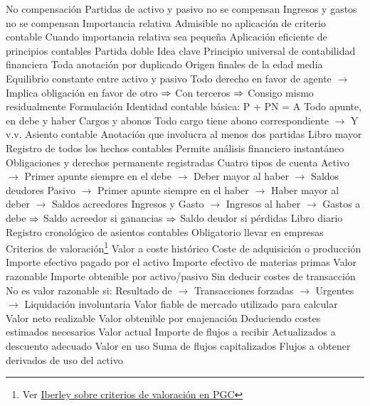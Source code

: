 \documentclass{nuevotema}
\begin{document}
\begin{esquemal}
			\3 No compensación
				\4 Partidas de activo y pasivo no se compensan
				\4 Ingresos y gastos no se compensan
			\3 Importancia relativa
				\4 Admisible no aplicación de criterio contable
				\4[] Cuando importancia relativa sea pequeña
				\4 Aplicación eficiente de principios contables
		\2 Partida doble
			\3 Idea clave
				\4 Principio universal de contabilidad financiera
				\4 Toda anotación por duplicado
				\4 Origen finales de la edad media
				\4 Equilibrio constante entre activo y pasivo
				\4[] Todo derecho en favor de agente
				\4[] $\to$ Implica obligación en favor de otro
				\4[] $\Rightarrow$ Con terceros
				\4[] $\Rightarrow$ Consigo mismo residualmente
			\3 Formulación
				\4 Identidad contable básica: P + PN = A
				\4 Todo apunte, en debe y haber
				\4 Cargos y abonos
				\4[] Todo cargo tiene abono correspondiente
				\4[] $\to$ Y v.v.
				\4 Asiento contable
				\4[] Anotación que involucra al menos dos partidas
			\3 Libro mayor
				\4 Registro de todos los hechos contables
				\4 Permite análisis financiero instantáneo
				\4[] Obligaciones y derechos permanente registradas
				\4 Cuatro tipos de cuenta
				\4[] Activo
				\4[] $\to$ Primer apunte siempre en el debe
				\4[] $\to$ Deber mayor al haber
				\4[] $\to$ Saldos deudores
				\4[] Pasivo
				\4[] $\to$ Primer apunte siempre en el haber
				\4[] $\to$ Haber mayor al deber
				\4[] $\to$ Saldos acreedores
				\4[] Ingresos y Gasto
				\4[] $\to$ Ingresos al haber
				\4[] $\to$ Gastos a debe
				\4[] $\Rightarrow$ Saldo acreedor si ganancias
				\4[] $\Rightarrow$ Saldo deudor si pérdidas
			\3 Libro diario
				\4 Registro cronológico de asientos contables
				\4 Obligatorio llevar en empresas
		\2 Criterios de valoración\footnote{Ver \href{https://www.iberley.es/temas/normas-criterios-valoracion-59284}{Iberley sobre criterios de valoración en PGC}}
			\3 Valor a coste histórico
				\4 Coste de adquisición o producción
				\4 Importe efectivo pagado por el activo
				\4 Importe efectivo de materias primas
			\3 Valor razonable
				\4 Importe obtenible por activo/pasivo
				\4 Sin deducir costes de transacción
				\4 No es valor razonable si:
				\4[] Resultado de
				\4[] $\to$ Transacciones forzadas
				\4[] $\to$ Urgentes
				\4[] $\to$ Liquidación involuntaria
				\4 Valor fiable de mercado utilizado para calcular
			\3 Valor neto realizable
				\4 Valor obtenible por enajenación
				\4 Deduciendo costes estimados necesarios
			\3 Valor actual
				\4 Importe de flujos a recibir
				\4 Actualizados a descuento adecuado
			\3 Valor en uso
				\4 Suma de flujos capitalizados
				\4 Flujos a obtener derivados de uso del activo

\end{esquemal}
\end{document}
